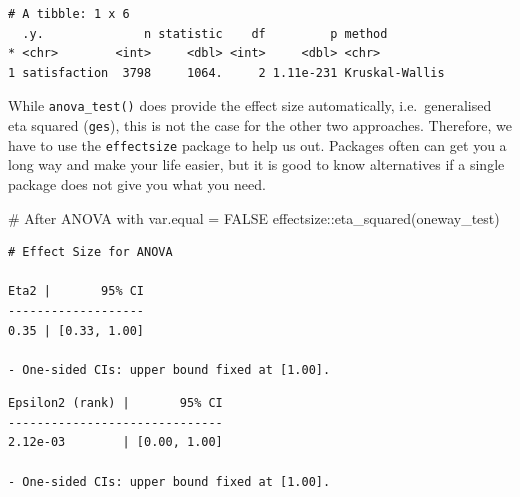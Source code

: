 \documentclass[
  letterpaper,
  DIV=11,
  numbers=noendperiod]{scrreprt}
\newenvironment{Shaded}{\begin{snugshade}}{\end{snugshade}}
\newcommand{\CommentTok}[1]{\textcolor[rgb]{0.37,0.37,0.37}{#1}}
\newcommand{\FunctionTok}[1]{\textcolor[rgb]{0.28,0.35,0.67}{#1}}
\newcommand{\NormalTok}[1]{\textcolor[rgb]{0.00,0.23,0.31}{#1}}
\newcommand{\SpecialCharTok}[1]{\textcolor[rgb]{0.37,0.37,0.37}{#1}}
\begin{document}
\begin{verbatim}
# A tibble: 1 x 6
  .y.              n statistic    df         p method        
* <chr>        <int>     <dbl> <int>     <dbl> <chr>         
1 satisfaction  3798     1064.     2 1.11e-231 Kruskal-Wallis
\end{verbatim}

While \texttt{anova\_test()} does provide the effect size automatically,
i.e.~generalised eta squared (\texttt{ges}), this is not the case for
the other two approaches. Therefore, we have to use the
\texttt{effectsize} package to help us out. Packages often can get you a
long way and make your life easier, but it is good to know alternatives
if a single package does not give you what you need.

\begin{Shaded}
\begin{Highlighting}[]
\CommentTok{\# After ANOVA with var.equal = FALSE}
\NormalTok{effectsize}\SpecialCharTok{::}\FunctionTok{eta\_squared}\NormalTok{(oneway\_test)}
\end{Highlighting}
\end{Shaded}

\begin{verbatim}
# Effect Size for ANOVA

Eta2 |       95% CI
-------------------
0.35 | [0.33, 1.00]

- One-sided CIs: upper bound fixed at [1.00].
\end{verbatim}

\begin{Shaded}
\end{Shaded}

\begin{verbatim}
Epsilon2 (rank) |       95% CI
------------------------------
2.12e-03        | [0.00, 1.00]

- One-sided CIs: upper bound fixed at [1.00].
\end{verbatim}
\end{document}
